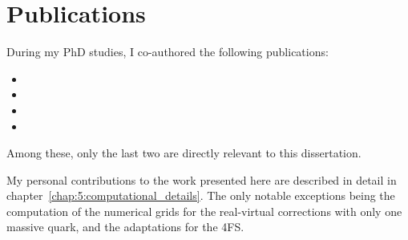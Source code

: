 \chapter*{Publications}

During my PhD studies, I co-authored the following publications:
\begin{itemize}
\item[\cite{Czakon:2022dwk}] 
\item[\cite{Czakon:2023tld}] 
\item[\cite{Czakon:2023kqm}] 
\item[\cite{Czakon:2024ywb}] 
\end{itemize}
\vspace{15pt}
Among these, only the last two are directly relevant to this dissertation.

My personal contributions to the work presented here are described in detail in chapter~\ref{chap:5:computational_details}. The only notable exceptions being the computation of the numerical grids for the real-virtual corrections with only one massive quark, and the adaptations for the 4\acs{FS}.



